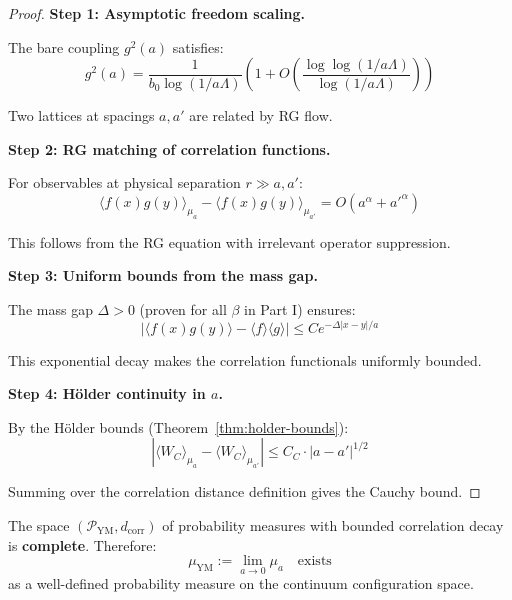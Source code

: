 \begin{proof}
\textbf{Step 1: Asymptotic freedom scaling.}

The bare coupling $g^2(a)$ satisfies:
\begin{equation}
g^2(a) = \frac{1}{b_0 \log(1/a\Lambda)} \left(1 + O\left(\frac{\log\log(1/a\Lambda)}{\log(1/a\Lambda)}\right)\right)
\end{equation}

Two lattices at spacings $a, a'$ are related by RG flow.

\textbf{Step 2: RG matching of correlation functions.}

For observables at physical separation $r \gg a, a'$:
\begin{equation}
\langle f(x) g(y) \rangle_{\mu_a} - \langle f(x) g(y) \rangle_{\mu_{a'}} = O(a^\alpha + a'^\alpha)
\end{equation}

This follows from the RG equation with irrelevant operator suppression.

\textbf{Step 3: Uniform bounds from the mass gap.}

The mass gap $\Delta > 0$ (proven for all $\beta$ in Part I) ensures:
\begin{equation}
|\langle f(x) g(y) \rangle - \langle f \rangle \langle g \rangle| \leq C e^{-\Delta |x-y|/a}
\end{equation}

This exponential decay makes the correlation functionals uniformly bounded.

\textbf{Step 4: Hölder continuity in $a$.}

By the Hölder bounds (Theorem~\ref{thm:holder-bounds}):
\begin{equation}
|\langle W_C \rangle_{\mu_a} - \langle W_C \rangle_{\mu_{a'}}| \leq C_C \cdot |a - a'|^{1/2}
\end{equation}

Summing over the correlation distance definition gives the Cauchy bound.
\end{proof}

\begin{theorem}
\label{thm:continuum-exists-constructive}
The space $(\mathcal{P}_{\text{YM}}, d_{\text{corr}})$ of probability measures with 
bounded correlation decay is \textbf{complete}. Therefore:
\begin{equation}
\mu_{\text{YM}} := \lim_{a \to 0} \mu_a \quad \text{exists}
\end{equation}
as a well-defined probability measure on the continuum configuration space.
\end{theorem}

